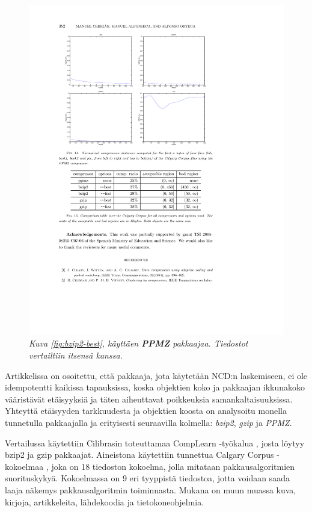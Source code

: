 \documentclass[12pt,finnish,final]{tktltiki2}
\theoremstyle{definition}
\theoremstyle{remark}
\begin{document}
    \begin{figure}[tb]
        \immediate{}
      \includegraphics{img/ppmz}
      \caption{\emph{Kuva \ref{fig:bzip2-best}, käyttäen \textbf{PPMZ} pakkaajaa. Tiedostot vertailtiin itsensä kanssa.} \cite{cebrian2005common}}
      \label{fig:ppmz}
    \end{figure}

      Artikkelissa \cite{cebrian2005common} on osoitettu, että pakkaaja, jota käytetään NCD:n laskemiseen, ei ole idempotentti kaikissa tapauksissa, koska objektien koko ja pakkaajan ikkunakoko vääristävät etäisyyksiä ja täten aiheuttavat poikkeuksia samankaltaisuuksissa. Yhteyttä etäisyyden tarkkuudesta ja objektien koosta on analysoitu monella tunnetulla pakkaajalla ja erityisesti seuraavilla kolmella:  \emph{bzip2}, \emph{gzip} ja \emph{PPMZ}.

      Vertailussa käytettiin Cilibrasin toteuttamaa CompLearn -työkalua \cite{complearn}, josta löytyy bzip2 ja gzip pakkaajat.
      Aineistona käytettiin tunnettua Calgary Corpus -kokoelmaa \cite{calgarycorpus}, joka on 18 tiedoston kokoelma, jolla mitataan pakkausalgoritmien suorituskykyä.
      Kokoelmassa on 9 eri tyyppistä tiedostoa, jotta voidaan saada laaja näkemys pakkausalgoritmin toiminnasta.
      Mukana on muun muassa kuva, kirjoja, artikkeleita, lähdekoodia ja tietokoneohjelmia.
\end{document}
